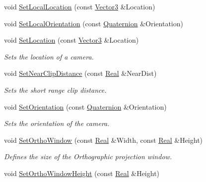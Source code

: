 \begin{DoxyCompactItemize}
void \hyperlink{classMezzanine_1_1Camera_ae62b56649606677f9922eeea658bdd2f}{SetLocalLocation} (const \hyperlink{classMezzanine_1_1Vector3}{Vector3} \&Location)
\item 
void \hyperlink{classMezzanine_1_1Camera_a8857075c6bc9e4d40075652778aa14c2}{SetLocalOrientation} (const \hyperlink{classMezzanine_1_1Quaternion}{Quaternion} \&Orientation)
\item 
void \hyperlink{classMezzanine_1_1Camera_afdc236c2c875035c8a11473350d0d17a}{SetLocation} (const \hyperlink{classMezzanine_1_1Vector3}{Vector3} \&Location)
\begin{DoxyCompactList}\small\item\em Sets the location of a camera. \item\end{DoxyCompactList}\item 
void \hyperlink{classMezzanine_1_1Camera_a638201c94b28ca0acc406b11f166e751}{SetNearClipDistance} (const \hyperlink{namespaceMezzanine_a726731b1a7df72bf3583e4a97282c6f6}{Real} \&NearDist)
\begin{DoxyCompactList}\small\item\em Sets the short range clip distance. \item\end{DoxyCompactList}\item 
void \hyperlink{classMezzanine_1_1Camera_af502b9c47b1acce46e1482ce049320eb}{SetOrientation} (const \hyperlink{classMezzanine_1_1Quaternion}{Quaternion} \&Orientation)
\begin{DoxyCompactList}\small\item\em Sets the orientation of the camera. \item\end{DoxyCompactList}\item 
void \hyperlink{classMezzanine_1_1Camera_a2beffe698c8952407f94683adea2fa24}{SetOrthoWindow} (const \hyperlink{namespaceMezzanine_a726731b1a7df72bf3583e4a97282c6f6}{Real} \&Width, const \hyperlink{namespaceMezzanine_a726731b1a7df72bf3583e4a97282c6f6}{Real} \&Height)
\begin{DoxyCompactList}\small\item\em Defines the size of the Orthographic projection window. \item\end{DoxyCompactList}\item 
void \hyperlink{classMezzanine_1_1Camera_a7e99427ba89306e3c7e6a0d5ccb23482}{SetOrthoWindowHeight} (const \hyperlink{namespaceMezzanine_a726731b1a7df72bf3583e4a97282c6f6}{Real} \&Height)

\end{DoxyCompactItemize}
